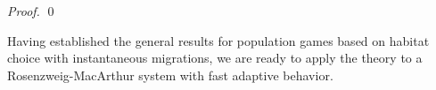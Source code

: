\begin{proof}
  \begin{comment}so is $-MdU$ for any $M$. Define the projection $\Pi$ from $H$ to $P_{2,\mu}$. Then the dynamical system
  \begin{equation}
    \dot{\sigma}_i = \Pi(-dU_i((\sigma)_{i=1}^M)))
  \end{equation}
  converges asymptotically to the Nash equilibrium \citep{}. The population dynamical system with instantanous Nash equilibrium is then equivalent to the system:
  \begin{equation}
    \label{eq:instant_nash_DE}
    \dot{N_i} = N_i f_i
    \lim_{\epsilon \to 0}\epsilon\dot{\sigma}_i = \Pi(-dU_i((\sigma)_{i=1}^M)))
  \end{equation}
  Since the first set of equations stays in the positive orthant where can introduce the projection operator $\Pi_R$, the system can be rewritten as
  \begin{equation}
    \dot{N_i} = \Pi_R(-(-N_i f_i))
    \epsilon\dot{\sigma}_i = \Pi(-dU_i((\sigma)_{i=1}^M)))
  \end{equation}
  This system converges asymptotically if the operator
  \begin{equation}
    \label{eq:de_sys}
    (-N_i f_i)_{i=1}^M \osum (\frac{1}{\epsilon}-dU)
  \end{equation}
  is strictly pseudomonotone. If there exists an $N$ such that \Cref{eq:de_sys} is strictly pseudomonotone, hence asymptotically stable, for all $\frac{1}{\epsilon}>N$, then \Cref{eq:instant_nash_DE} is also asymptotically stable.

\end{comment}
    \qed

\end{proof}
Having established the general results for population games based on habitat choice with instantaneous migrations, we are ready to apply the theory to a Rosenzweig-MacArthur system with fast adaptive behavior.
